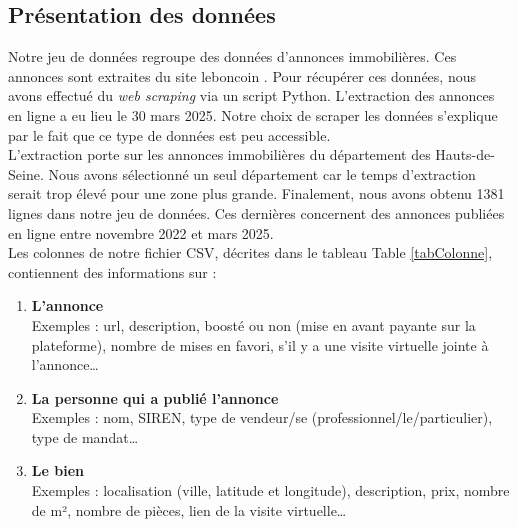 \documentclass[a4paper, 12pt, twoside]{report}
\begin{document}
		\subsection{Présentation des données}

		Notre jeu de données regroupe des données d’annonces immobilières. Ces annonces sont extraites du site leboncoin \cite{leboncoin}. Pour récupérer ces données, nous avons effectué du {\it web scraping} via un script Python. L'extraction des annonces en ligne a eu lieu le 30 mars 2025. Notre choix de scraper les données s'explique par le fait que ce type de données est peu accessible. \\

		L'extraction porte sur les annonces immobilières du département des Hauts-de-Seine. Nous avons sélectionné un seul département car le temps d'extraction serait trop élevé pour une zone plus grande. Finalement, nous avons obtenu 1381 lignes dans notre jeu de données. Ces dernières concernent des annonces publiées en ligne entre novembre 2022 et mars 2025. \\

		Les colonnes de notre fichier CSV, décrites dans le tableau Table \ref{tabColonne}, contiennent des informations sur :
		\begin{enumerate}
			\item {\bf L'annonce} \\
			Exemples : url, description, boosté ou non (mise en avant payante sur la plateforme), nombre de mises en favori, s’il y a une visite virtuelle jointe à l’annonce…
			\item {\bf La personne qui a publié l'annonce} \\
			Exemples : nom, SIREN, type de vendeur/se (professionnel/le/particulier), type de mandat…
			\item {\bf Le bien} \\
			Exemples : localisation (ville, latitude et longitude), description, prix, nombre de m², nombre de pièces, lien de la visite virtuelle…
		\end{enumerate}
		
\end{document}
